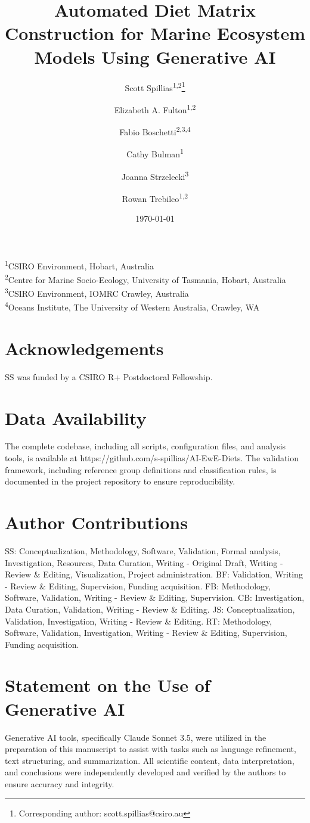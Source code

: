 \documentclass[12pt,a4paper]{article}
\title{Automated Diet Matrix Construction for Marine Ecosystem Models Using Generative AI}
\author{Scott Spillias\textsuperscript{1,2}\thanks{Corresponding author: scott.spillias@csiro.au} \and
Elizabeth A. Fulton\textsuperscript{1,2} \and
Fabio Boschetti\textsuperscript{2,3,4} \and
Cathy Bulman\textsuperscript{1} \and
Joanna Strzelecki\textsuperscript{3} \and
Rowan Trebilco\textsuperscript{1,2}}
\date{\today}
\newcommand{\affiliations}{
\noindent\textsuperscript{1}CSIRO Environment, Hobart, Australia\\
\textsuperscript{2}Centre for Marine Socio-Ecology, University of Tasmania, Hobart, Australia\\
\textsuperscript{3}CSIRO Environment, IOMRC Crawley, Australia\\
\textsuperscript{4}Oceans Institute, The University of Western Australia, Crawley, WA\\
}
\begin{document}
\maketitle
\affiliations

\section*{Acknowledgements}
SS was funded by a CSIRO R+ Postdoctoral Fellowship.

\section*{Data Availability}
The complete codebase, including all scripts, configuration files, and analysis tools, is available at https://github.com/s-spillias/AI-EwE-Diets. The validation framework, including reference group definitions and classification rules, is documented in the project repository to ensure reproducibility.

\section*{Author Contributions}
SS: Conceptualization, Methodology, Software, Validation, Formal analysis, Investigation, Resources, Data Curation, Writing - Original Draft, Writing - Review \& Editing, Visualization, Project administration. BF: Validation, Writing - Review \& Editing, Supervision, Funding acquisition. FB: Methodology, Software, Validation, Writing - Review \& Editing, Supervision. CB: Investigation, Data Curation, Validation, Writing - Review \& Editing. JS: Conceptualization, Validation, Investigation, Writing - Review \& Editing. RT: Methodology, Software, Validation, Investigation, Writing - Review \& Editing, Supervision, Funding acquisition.

\section*{Statement on the Use of Generative AI}
Generative AI tools, specifically Claude Sonnet 3.5, were utilized in the preparation of this manuscript to assist with tasks such as language refinement, text structuring, and summarization. All scientific content, data interpretation, and conclusions were independently developed and verified by the authors to ensure accuracy and integrity.
\end{document}
